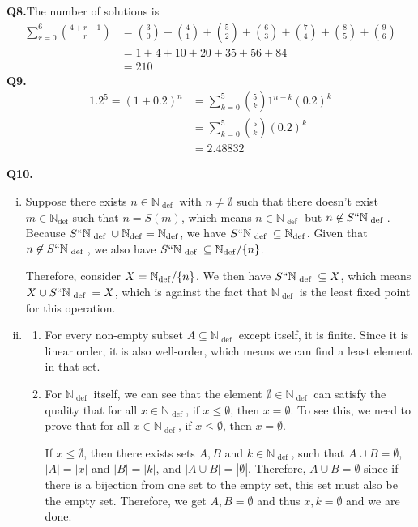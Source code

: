 \documentclass{article}[12pt]
\begin{document}
\noindent \textbf{Q8.}The number of solutions is
\begin{align*}
\sum_{r=0}^6\binom{4+r-1}{r}&=\binom{3}{0}+\binom{4}{1}+\binom{5}{2}+\binom{6}{3}+\binom{7}{4}+\binom{8}{5}+\binom{9}{6}\\
&=1+4+10+20+35+56+84\\&=210
\end{align*}
\noindent \textbf{Q9.}
\begin{align*}
1.2^5=(1+0.2)^n&=\sum_{k=0}^5\binom{5}{k}1^{n-k}(0.2)^k\\
&=\sum_{k=0}^5\binom{5}{k}(0.2)^k\\
&=2.48832
\end{align*}

\noindent \textbf{Q10.}
\begin{enumerate} [(i)]
\item Suppose there exists $n \in \mathbb{N}_{\text { def }}$ with $n \neq \emptyset$ such that there doesn't exist $m \in \mathbb{N}_{\mathrm{def}}$ such that $n=S(m)$, which means $n\in \mathbb{N_{\text { def }}}$ but $n\not\in S``\mathbb{N_{\text { def }}}$. Because $S``\mathbb{N_{\text { def }}}\cup \mathbb{N}_{\mathrm{def}}=\mathbb{N}_{\mathrm{def}}$, we have $S``\mathbb{N_{\text { def }}}\subseteq \mathbb{N}_{\mathrm{def}}$. Given that $n\not\in S``\mathbb{N_{\text { def }}}$, we also have $S``\mathbb{N_{\text { def }}}\subseteq \mathbb{N}_{\mathrm{def}}/\{n\}$.

Therefore, consider $X=\mathbb{N}_{\rm{def}}/\{n\}$. We then have  $S``\mathbb{N_{\text{ def }}}\subseteq X$, which means $X\cup S``\mathbb{N_{\text{ def }}}=X$, which is against the fact that $\mathbb{N}_{\text{ def }}$ is the least fixed point for this operation.
\item 
\begin{enumerate}
\item For every non-empty subset $A\subseteq \mathbb{N}_{\text{ def }}$ except itself, it is finite. Since it is linear order, it is also well-order, which means we can find a least element in that set.
\item For $\mathbb{N}_{\text{ def }}$ itself, we can see that the element $\emptyset\in \mathbb{N}_{\text{ def }}$ can satisfy the quality that for all $x\in \mathbb{N}_{\text{ def }}$, if $x\leq \emptyset$, then $x=\emptyset$. To see this, we need to prove that for all $x\in \mathbb{N}_{\text{ def }}$, if $x\leq \emptyset$, then $x=\emptyset$.
\par If $x\leq \emptyset$, then there exists sets $A,B$ and $k\in \mathbb{N}_{\text{ def }}$, such that $A\cup B=\emptyset$, $|A|=|x|$ and $|B|=|k|$, and $|A\cup B|=|\emptyset|$. Therefore, $A\cup B=\emptyset$ since if there is a bijection from one set to the empty set, this set must also be the empty set. Therefore, we get $A,B=\emptyset$ and thus $x,k=\emptyset$ and we are done.
\end{enumerate}






\end{enumerate}
\end{document}
